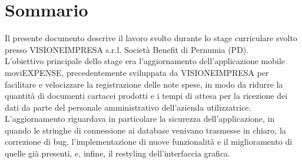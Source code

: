 \cleardoublepage
{}
{}
\begingroup
\let\clearpage\relax
\let\cleardoublepage\relax
\let\cleardoublepage\relax

\chapter*{Sommario}

Il presente documento descrive il lavoro svolto durante lo stage curriculare svolto presso VISIONEIMPRESA s.r.l. Società Benefit di Pernumia (PD).\\
L'obiettivo principale dello stage era l'aggiornamento dell'applicazione mobile moviEXPENSE, precedentemente sviluppata da VISIONEIMPRESA per facilitare e velocizzare la registrazione delle note spese, in modo da ridurre la quantità di documenti cartacei prodotti e i tempi di attesa per la ricezione dei dati da parte del personale amministrativo dell'azienda utilizzatrice.\\
L'aggiornamento riguardava in particolare la sicurezza dell'applicazione, in quando le stringhe di connessione ai database venivano trasmesse in chiaro, la correzione di bug, l'implementazione di nuove funzionalità e il miglioramento di quelle già presenti, e, infine, il restyling dell'interfaccia grafica.

\endgroup

\vfill
